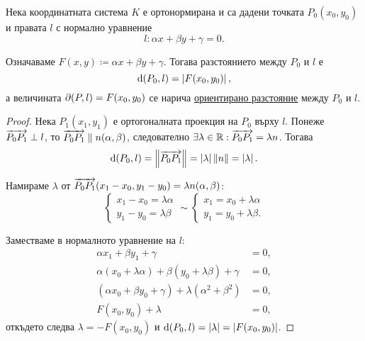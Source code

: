 \documentclass[numbers=endperiod, DIV=15]{scrartcl}
\begin{document}
\begin{theorem}\label{thm:plane-dist}
  Нека координатната система $K$ е ортонормирана и са дадени точката $P_0(x_0, y_0)$ и правата $l$ с нормално уравнение
  \begin{displaymath}
    l: \alpha x + \beta y + \gamma = 0.
  \end{displaymath}

  Означаваме $F(x, y) \coloneqq \alpha x + \beta y + \gamma$. Тогава разстоянието между $P_0$ и $l$ е
  \begin{displaymath}
    \operatorname{d}(P_0, l) = \left\vert F(x_0, y_0) \right\vert,
  \end{displaymath}
  а величината $\partial(P, l) = F(x_0, y_0)$ се нарича \underline{ориентирано разстояние} между $P_0$ и $l$.
\end{theorem}
\begin{proof}
  Нека $P_1(x_1, y_1)$ е ортогоналната проекция на $P_0$ върху $l$. Понеже $\overrightarrow{P_0 P_1} \perp l$, то $\overrightarrow{P_0 P_1} \parallel n(\alpha, \beta)$, следователно $\exists \lambda \in \mathbb{R}: \overrightarrow{P_0 P_1} = \lambda n$. Тогава
  \begin{displaymath}
    \operatorname{d}(P_0, l)
    =
    \left\Vert \overrightarrow{P_0 P_1} \right\Vert
    =
    \left\vert \lambda \right\vert \left\Vert n \right\Vert
    =
    \left\vert \lambda \right\vert.
  \end{displaymath}

  Намираме $\lambda$ от $\overrightarrow{P_0 P_1}(x_1 - x_0, y_1 - y_0) = \lambda n(\alpha, \beta)$:
  \begin{displaymath}
    \begin{cases}
      x_1 - x_0 = \lambda \alpha \\
      y_1 - y_0 = \lambda \beta
    \end{cases}
    \sim
    \begin{cases}
      x_1 = x_0 + \lambda \alpha \\
      y_1 = y_0 + \lambda \beta.
    \end{cases}
  \end{displaymath}

  Заместваме в нормалното уравнение на $l$:
  \begin{align*}
    \alpha x_1 + \beta y_1 + \gamma &= 0,
    \\
    \alpha (x_0 + \lambda \alpha) + \beta (y_0 + \lambda \beta) + \gamma &= 0,
    \\
    (\alpha x_0 + \beta y_0 + \gamma) + \lambda(\alpha^2 + \beta^2) &= 0,
    \\
    F(x_0, y_0) + \lambda &= 0,
  \end{align*}
  откъдето следва $\lambda = -F(x_0, y_0)$ и $\operatorname{d}(P_0, l) = \left\vert \lambda \right\vert = \left\vert F(x_0, y_0) \right\vert$.
\end{proof}
\end{document}
